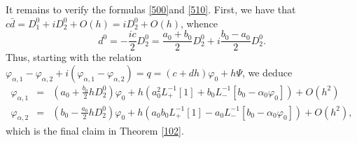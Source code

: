 \documentclass[12pt]{amsart}
\theoremstyle{definition}
\theoremstyle{remark}
\numberwithin{equation}{section}
\renewcommand{\(}{\left(}
\renewcommand{\)}{\right)}
\renewcommand{\[}{\left[}
\renewcommand{\]}{\right]}
\newcommand{\f}[2]{\frac{#1}{#2}}
\newcommand{\al}{\alpha}
\newcommand{\vp}{\varphi}
\begin{document}
   It remains to verify the  formulas \eqref{500}and \eqref{510}. First, we have that $c\bar{d}=D_1^0+i D_2^0+O(h)=i D_2^0+O(h)$, whence
\begin{equation}
\label{c:30}
d^0= - \f{i c}{2} D_2^0=\f{a_0+b_0}{2} D_2^0 +i\f{b_0-a_0}{2} D_2^0.
\end{equation}
   Thus, starting with the relation $\vp_{\al,1}-\vp_{\al,2}+i (\vp_{\al,1}-\vp_{\al,2})=q=(c+d h)\vp_0 +h \Psi$, we deduce
    \begin{eqnarray*}
     \vp_{\al,1} &=& (a_0+\f{b_0}{2} h D_2^0)\vp_0 +h(a_0^2 L_+^{-1}[1]+b_0 L_-^{-1}[b_0-\al_0 \vp_0]) +O(h^2)\\
     \vp_{\al,2} &=&(b_0-\f{a_0}{2} h D_2^0)\vp_0 +h(a_0 b_0 L_+^{-1}[1]-a_0 L_-^{-1}[b_0-\al_0 \vp_0]) +O(h^2),
    \end{eqnarray*}
 which is the final claim in Theorem \ref{102}.
\end{document}
